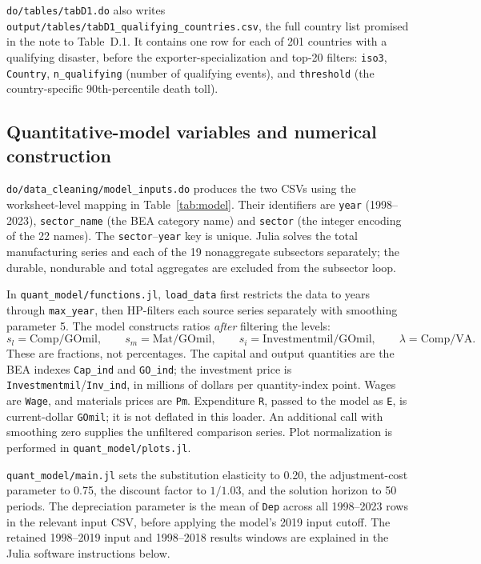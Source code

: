 \documentclass[11pt]{article}
\newcommand{\pkgfile}[1]{\nolinkurl{#1}}
\begin{document}
\pkgfile{do/tables/tabD1.do} also writes
\pkgfile{output/tables/tabD1_qualifying_countries.csv}, the full country
list promised in the note to Table~D.1. It contains one row for each of
201 countries with a qualifying disaster, before the exporter-specialization
and top-20 filters: \texttt{iso3}, \texttt{Country},
\texttt{n\_qualifying} (number of qualifying events), and
\texttt{threshold} (the country-specific 90th-percentile death toll).


\subsection{Quantitative-model variables and numerical construction}

\pkgfile{do/data_cleaning/model_inputs.do} produces the two CSVs using the
worksheet-level mapping in Table~\ref{tab:model}. Their identifiers are
\texttt{year} (1998--2023), \texttt{sector\_name} (the BEA category name)
and \texttt{sector} (the integer encoding of the 22 names). The
\texttt{sector}--\texttt{year} key is unique. Julia solves the total
manufacturing series and each of the 19 nonaggregate subsectors separately;
the durable, nondurable and total aggregates are excluded from the
subsector loop.

In \pkgfile{quant_model/functions.jl}, \texttt{load\_data} first restricts
the data to years through \texttt{max\_year}, then HP-filters each source
series separately with smoothing parameter 5. The model constructs ratios
\emph{after} filtering the levels:
\[
 s_l=\mathrm{Comp}/\mathrm{GOmil},\qquad
 s_m=\mathrm{Mat}/\mathrm{GOmil},\qquad
 s_i=\mathrm{Investmentmil}/\mathrm{GOmil},\qquad
 \lambda=\mathrm{Comp}/\mathrm{VA}.
\]
These are fractions, not percentages. The capital and output quantities
are the BEA indexes \texttt{Cap\_ind} and \texttt{GO\_ind}; the investment
price is \texttt{Investmentmil}/\texttt{Inv\_ind}, in millions of dollars
per quantity-index point. Wages are \texttt{Wage}, and materials prices
are \texttt{Pm}. Expenditure \texttt{R}, passed to the model as \texttt{E},
is current-dollar \texttt{GOmil}; it is not deflated in this loader.
An additional call with smoothing zero supplies the unfiltered comparison
series. Plot normalization is performed in \pkgfile{quant_model/plots.jl}.

\pkgfile{quant_model/main.jl} sets the substitution elasticity to 0.20,
the adjustment-cost parameter to 0.75, the discount factor to $1/1.03$,
and the solution horizon to 50 periods. The depreciation parameter is the
mean of \texttt{Dep} across all 1998--2023 rows in the relevant input
CSV, before applying the model's 2019 input cutoff. The retained
1998--2019 input and 1998--2018 results windows are explained in the
Julia software instructions below.
\end{document}
